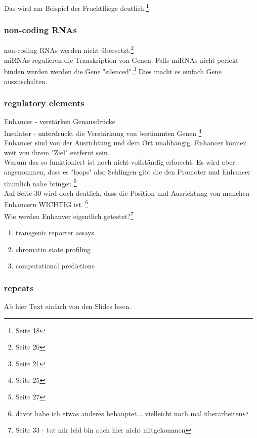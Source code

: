 \documentclass{article}
\begin{document}
Das wird am Beispiel der Fruchtfliege deutlich.\footnote{Seite 18}\\ 

\subsubsection{non-coding RNAs}
non-coding RNAs werden nicht übersetzt.\footnote{Seite 20}\\

miRNAs regulieren die Transkription von Genen. Falls miRNAs nicht perfekt binden werden werden 
die Gene "silenced".\footnote{Seite 21} Dies macht es einfach Gene auszuschalten. \\


\subsubsection{regulatory elements}
Enhancer - verstärken Genausdrücke\\
Insulator - unterdrückt die Verstärkung von bestimmten Genen \footnote{Seite 25}\\

Enhancer sind von der Ausrichtung und dem Ort unabhängig. Enhancer können weit von ihrem "Ziel"
entfernt sein.\\
Warum das so funktioniert ist noch nicht vollständig erforscht. Es wird aber angenommen, dass
es "loops" also Schlingen gibt die den Promoter und Enhancer räumlich nahe bringen.\footnote{Seite 27}\\

Auf Seite 30 wird doch deutlich, dass die Position und Ausrichtung von manchen Enhancern WICHTIG ist.
\footnote{davor habe ich etwas anderes behauptet... vielleicht noch mal überarbeiten}\\

Wie werden Enhanver eigentlich getestet?\footnote{Seite 33 - tut mir leid bin auch hier nicht mitgekommen}\\
\begin{enumerate}
\item transgenic reporter assays
\item chromatin state profiling
\item computational predictions
\end{enumerate}

\subsubsection{repeats}
Ab hier Text einfach von den Slides lesen.\\
\end{document}
